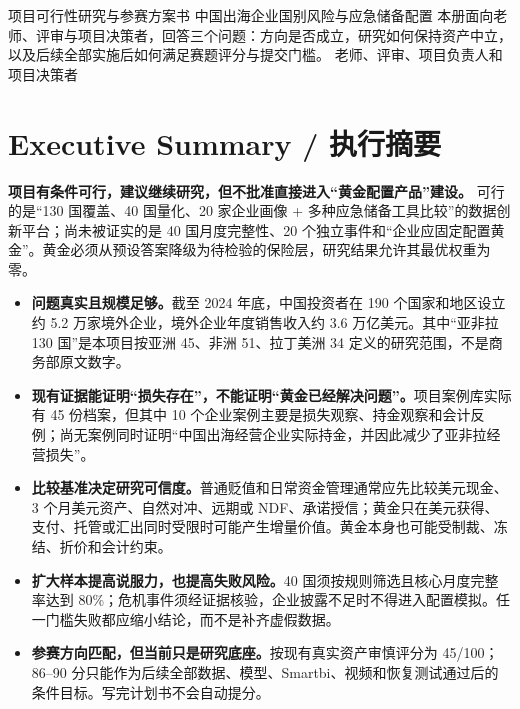 \documentclass[UTF8,12pt,openany]{ctexbook}
\begin{document}
\PlanTitlePage
  {项目可行性研究与参赛方案书}
  {中国出海企业国别风险与应急储备配置}
  {本册面向老师、评审与项目决策者，回答三个问题：方向是否成立，研究如何保持资产中立，以及后续全部实施后如何满足赛题评分与提交门槛。}
  {老师、评审、项目负责人和项目决策者}

\frontmatter
\chapter*{Executive Summary / 执行摘要}

\begin{decisionbox}[可行性判定]
\textbf{项目有条件可行，建议继续研究，但不批准直接进入“黄金配置产品”建设。}
可行的是“130 国覆盖、40 国量化、20 家企业画像 + 多种应急储备工具比较”的数据创新平台；尚未被证实的是 40 国月度完整性、20 个独立事件和“企业应固定配置黄金”。黄金必须从预设答案降级为待检验的保险层，研究结果允许其最优权重为零。
\end{decisionbox}

\begin{itemize}
  \item \textbf{问题真实且规模足够。}截至 2024 年底，中国投资者在 190 个国家和地区设立约 5.2 万家境外企业，境外企业年度销售收入约 3.6 万亿美元\autocite{mofcom2024ofdi}。其中“亚非拉 130 国”是本项目按亚洲 45、非洲 51、拉丁美洲 34 定义的研究范围，不是商务部原文数字。
  \item \textbf{现有证据能证明“损失存在”，不能证明“黄金已经解决问题”。}项目案例库实际有 45 份档案，但其中 10 个企业案例主要是损失观察、持金观察和会计反例；尚无案例同时证明“中国出海经营企业实际持金，并因此减少了亚非拉经营损失”\autocite{caselibrary2026}。
  \item \textbf{比较基准决定研究可信度。}普通贬值和日常资金管理通常应先比较美元现金、3 个月美元资产、自然对冲、远期或 NDF、承诺授信；黄金只在美元获得、支付、托管或汇出同时受限时可能产生增量价值。黄金本身也可能受制裁、冻结、折价和会计约束\autocite{ofac1029,bislcr2013,ifrscommodity2016}。
  \item \textbf{扩大样本提高说服力，也提高失败风险。}40 国须按规则筛选且核心月度完整率达到 80\%；危机事件须经证据核验，企业披露不足时不得进入配置模拟。任一门槛失败都应缩小结论，而不是补齐虚假数据。
  \item \textbf{参赛方向匹配，但当前只是研究底座。}按现有真实资产审慎评分为 45/100；86--90 分只能作为后续全部数据、模型、Smartbi、视频和恢复测试通过后的条件目标。写完计划书不会自动提分。
\end{itemize}
\end{document}
